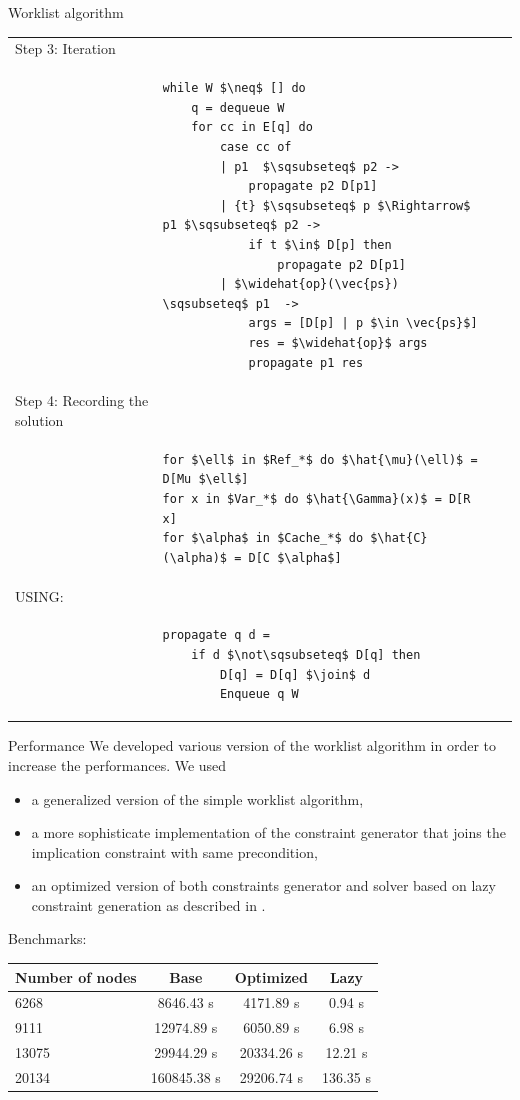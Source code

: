 \documentclass[11pt]{beamer}
\begin{document}
\begin{frame}[fragile]{Worklist algorithm}
\begin{tiny}
\begin{tabular}{l l l}
Step 3: Iteration\\
&
\begin{lstlisting}[mathescape]
while W $\neq$ [] do
    q = dequeue W
    for cc in E[q] do
        case cc of
        | p1  $\sqsubseteq$ p2 -> 
            propagate p2 D[p1]
        | {t} $\sqsubseteq$ p $\Rightarrow$ p1 $\sqsubseteq$ p2 -> 
            if t $\in$ D[p] then
                propagate p2 D[p1]
        | $\widehat{op}(\vec{ps}) \sqsubseteq$ p1  -> 
            args = [D[p] | p $\in \vec{ps}$]
            res = $\widehat{op}$ args
            propagate p1 res
\end{lstlisting}\\
Step 4: Recording the solution\\
&
\begin{lstlisting}[mathescape]
for $\ell$ in $Ref_*$ do $\hat{\mu}(\ell)$ = D[Mu $\ell$]
for x in $Var_*$ do $\hat{\Gamma}(x)$ = D[R x]
for $\alpha$ in $Cache_*$ do $\hat{C}(\alpha)$ = D[C $\alpha$]
\end{lstlisting}\\
USING: \\
&
\begin{lstlisting}[mathescape]
propagate q d =
    if d $\not\sqsubseteq$ D[q] then
        D[q] = D[q] $\join$ d
        Enqueue q W    
\end{lstlisting}\\
\end{tabular}
\end{tiny}
\end{frame}

\begin{frame}{Performance}
We developed various version of the worklist algorithm in order to increase the performances. We used
\begin{itemize}
\item a generalized version of the simple worklist algorithm,
\item a more sophisticate implementation of the constraint generator that joins the implication constraint with same precondition,
\item an optimized version of both constraints generator and solver based on lazy constraint generation as described in \cite{TAJSLazy}.
\end{itemize}

Benchmarks:
\begin{center}
\begin{tabular}{|l|c|c|c|}
\hline
Number of nodes & Base & Optimized & Lazy\\
\hline
6268 & 8646.43 s & 4171.89 s & 0.94 s\\
\hline
9111 & 12974.89 s & 6050.89 s & 6.98 s\\
\hline
13075 & 29944.29 s & 20334.26 s & 12.21 s\\
\hline
20134 & 160845.38 s & 29206.74 s & 136.35 s\\
\hline
\end{tabular}
\end{center}
\end{frame}
\end{document}
